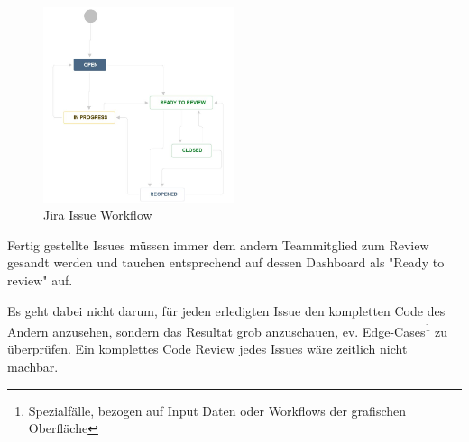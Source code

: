 		\begin{figure}[H]
			\includegraphics[width=0.5\textwidth]{projectPlan/media/img/jiraIssueWorkflow.jpg}
			\centering
			\caption{Jira Issue Workflow}
			\label{fig:jiraIssueWorkflow}
		\end{figure}
		
		Fertig gestellte Issues müssen immer dem andern Teammitglied
		zum Review gesandt werden und tauchen entsprechend auf dessen
		Dashboard als "Ready to review" auf.
		
		Es geht dabei nicht darum, 
		für jeden erledigten Issue den kompletten Code des Andern anzusehen, 
		sondern das Resultat grob anzuschauen, ev. 
		Edge-Cases\footnote{Spezialfälle, bezogen auf Input Daten oder 
		Workflows der grafischen Oberfläche} zu überprüfen. 
		Ein komplettes Code Review jedes Issues wäre zeitlich nicht machbar.